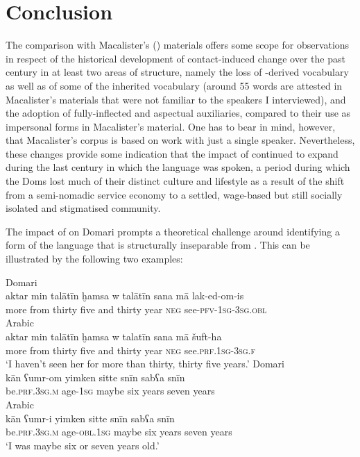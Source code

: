 \documentclass[output=paper]{langsci/langscibook}
\begin{document}
\section{Conclusion}\largerpage

The comparison with Macalister's (\citeyear{Macalister1914}) materials offers some scope for observations in respect of the historical development of contact-induced change over the past century in at least two areas of structure, namely the loss of -derived vocabulary as well as of some of the inherited  vocabulary (around 55 words are attested in Macalister’s materials that were not familiar to the speakers I interviewed), and the adoption of fully-inflected  and aspectual auxiliaries, compared to their use as impersonal forms in Macalister’s material. One has to bear in mind, however, that Macalister’s corpus is based on work with just a single speaker. Nevertheless, these changes provide some indication that the impact of  continued to expand during the last century in which the language was spoken, a period during which the Doms lost much of their distinct culture and lifestyle as a result of the shift from a semi-nomadic service economy to a settled, wage-based but still socially isolated and stigmatised community. 

The impact of  on Domari prompts a theoretical challenge around identifying a form of the language that is structurally inseparable from . This can be illustrated by the following two examples:

\ea \label{aktar1}
\ea
{Domari}\\
\gll aktar min talātīn ḫamsa w talātīn sana mā lak-ed-om-is\\
     more from thirty five and thirty year \textsc{neg} see-\textsc{pfv-1sg-3sg.obl}\\ \label{aktar}
\ex
{Arabic}\\
\gll aktar min talātīn ḫamsa w talatīn sana mā šuft-ha\\
     more from thirty five and thirty year \textsc{neg} see.\textsc{prf.1sg-3sg.f}\\ \label{aktar2}
\glt ‘I haven’t seen her for more than thirty, thirty five years.’
\z
\ex  \label{umr1}
\ea
{Domari}\\
\gll kān ʕumr-om yimken sitte snīn sabʕa snīn\\
     be\textsc{.prf.3sg.m} age-\textsc{1sg} maybe six years seven years\\ \label{umr}
\ex
{Arabic}\\
\gll kān ʕumr-i yimken sitte snīn sabʕa snīn\\
     be\textsc{.prf.3sg.m} age-\textsc{obl.1sg} maybe six years seven years\\ \label{umr2}
\glt ‘I was maybe six or seven years old.’
\z
\z
\end{document}
